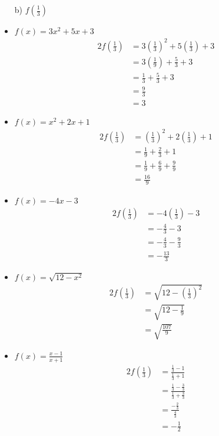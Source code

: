 \documentclass{templateNote}
\begin{document}
\begin{itemize}
    \item[b)] $f(\frac{1}{3})$
    \item $f(x) = 3x^2 + 5x + 3$
    \begin{alignat*}{2}
        f(\frac{1}{3}) &= 3(\frac{1}{3})^2 + 5(\frac{1}{3}) + 3 \\
        &= 3(\frac{1}{9}) + \frac{5}{3} + 3 \\
        &= \frac{1}{3} + \frac{5}{3} + 3 \\
        &= \frac{9}{3} \\
        &= 3
    \end{alignat*}
    \item $f(x) = x^2 + 2x + 1$
    \begin{alignat*}{2}
        f(\frac{1}{3}) &= (\frac{1}{3})^2 + 2(\frac{1}{3}) + 1 \\
        &= \frac{1}{9} + \frac{2}{3} + 1 \\
        &= \frac{1}{9} + \frac{6}{9} + \frac{9}{9} \\
        &= \frac{16}{9}
    \end{alignat*}
    \item $f(x) = -4x - 3$
    \begin{alignat*}{2}
        f(\frac{1}{3}) &= -4(\frac{1}{3}) - 3 \\
        &= -\frac{4}{3} - 3 \\
        &= -\frac{4}{3} - \frac{9}{3} \\
        &= -\frac{13}{3}
    \end{alignat*}
    \item $f(x) = \sqrt{12 - x^2}$
    \begin{alignat*}{2}
        f(\frac{1}{3}) &= \sqrt{12 - (\frac{1}{3})^2} \\
        &= \sqrt{12 - \frac{1}{9}} \\
        &= \sqrt{\frac{107}{9}}
    \end{alignat*}
    \item $f(x) = \frac{x-1}{x+1}$
    \begin{alignat*}{2}
        f(\frac{1}{3}) &= \frac{\frac{1}{3} - 1}{\frac{1}{3} + 1} \\
        &= \frac{\frac{1}{3} - \frac{3}{3}}{\frac{1}{3} + \frac{3}{3}} \\
        &= \frac{-\frac{2}{3}}{\frac{4}{3}} \\
        &= -\frac{1}{2}
    \end{alignat*}
\end{itemize}
\end{document}
